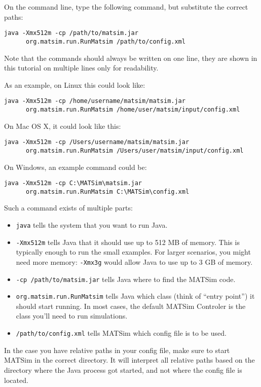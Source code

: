 On the command line, type the following command, but substitute the correct
paths:
\begin{verbatim}
java -Xmx512m -cp /path/to/matsim.jar
      org.matsim.run.RunMatsim /path/to/config.xml
\end{verbatim}
Note that the commands should always be written on one line, they are shown in
this tutorial on multiple lines only for readability.

As an example, on Linux this could look like:
\begin{verbatim}
java -Xmx512m -cp /home/username/matsim/matsim.jar 
      org.matsim.run.RunMatsim /home/user/matsim/input/config.xml
\end{verbatim}

On Mac OS X, it could look like this:
\begin{verbatim}
java -Xmx512m -cp /Users/username/matsim/matsim.jar 
      org.matsim.run.RunMatsim /Users/user/matsim/input/config.xml
\end{verbatim}

On Windows, an example command could be:
\begin{verbatim}
java -Xmx512m -cp C:\MATSim\matsim.jar 
      org.matsim.run.RunMatsim C:\MATSim\config.xml
\end{verbatim}

Such a command exists of multiple parts:
\begin{itemize}
  \item {\tt java} tells the system that you want to run Java.
  \item {\tt -Xmx512m} tells Java that it should use up to 512 MB of memory.
  This is typically enough to run the small examples. For larger scenarios, you
  might need more memory: {\tt -Xmx3g} would allow Java to use up to 3 GB of
  memory.
  \item {\tt -cp /path/to/matsim.jar} tells Java where to find the MATSim code.
  \item {\tt org.matsim.run.RunMatsim} tells Java which class (think of ``entry
  point'') it should start running. In most cases, the default MATSim Controler
  is the class you'll need to run simulations.
  \item {\tt /path/to/config.xml} tells MATSim which config file is to be used.
\end{itemize}

In the case you have relative paths in your config file, make sure to start
MATSim in the correct directory. It will interpret all relative paths based on
the directory where the Java process got started, and not where the config file
is located.

